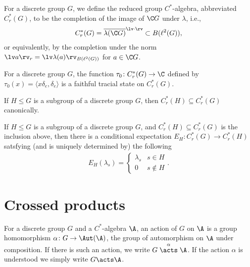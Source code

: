 \begin{definition}\label{reduc alg def}
For a discrete group $G$, we define the reduced group $C^*$-algebra, abbreviated $C_r^*(G)$, to be the completion of the image of $\C G$ under $\lambda$, i.e.,
\begin{align*}
C_r^*(G)=\overline{\lambda(\C G)}^{\lv \cdot \rv} \subset B(\ell^2(G)),
\end{align*} 
or equivalently, by the completion under the norm $\lv a \rv_r=\lv \lambda(a) \rv_{B(\ell^2(G))}$ for $a \in \C G$.
\end{definition}


\begin{proposition}
For a discrete group $G$, the function $\tau_0 \colon C_r^*(G) \to \C$ defined by $\tau_0(x)=\langle x \delta_e,\delta_e\rangle$ is a faithful tracial state on $C_r^*(G)$. 
\end{proposition}	

\begin{proposition}
If $H \leq G$ is a subgroup of a discrete group $G$, then $C_r^*(H) \subseteq C_r^*(G)$ canonically. 
\end{proposition}

\begin{proposition}
If $H \leq G$ is a subgroup of a discrete group $G$, and $C_r^*(H) \subseteq C_r^*(G)$ is the inclusion above, then there is a conditional expectation $E_H \colon C_r^*(G) \to C_r^*(H)$ satsfying (and is uniquely determined by) the following
\begin{align*}
E_H(\lambda_s)=\begin{cases}
\lambda_s & s \in H\\
0 & s \not\in H
\end{cases}.
\end{align*}
\end{proposition}

\section{Crossed products}
\begin{definition}
For a discrete group $G$ and a $C^*$-algebra $\A$, an action of $G$ on $\A$ is a group homomorphism $\alpha \colon G \to \Aut(\A)$, the group of automorphism on $\A$ under composition. If there is such an action, we write $G \stackrel{\alpha}{\acts} \A$. If the action $\alpha$ is understood we simply write $G \acts \A$.
\end{definition}

